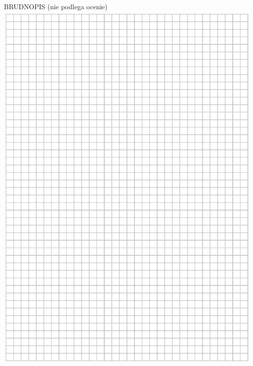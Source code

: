 \documentclass[10pt]{article}
\begin{document}
BRUDNOPIS (nie podlega ocenie)\\
\includegraphics[max width=\textwidth, center]{2024_11_21_0a35d272448d5080a489g-11}
\end{document}
